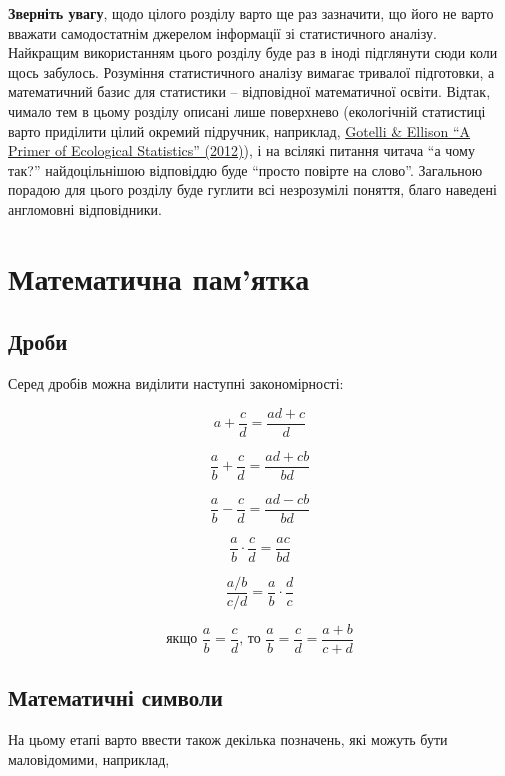\documentclass[
  11pt,
]{book}
\begin{document}
\textbf{{Зверніть увагу}}, щодо цілого розділу варто ще раз зазначити, що його не варто вважати самодостатнім джерелом інформації зі статистичного аналізу. Найкращим використанням цього розділу буде раз в іноді підглянути сюди коли щось забулось. Розуміння статистичного аналізу вимагає тривалої підготовки, а математичний базис для статистики -- відповідної математичної освіти. Відтак, чимало тем в цьому розділу описані лише поверхнево (екологічній статистиці варто приділити цілий окремий підручник, наприклад, \href{https://global.oup.com/academic/product/a-primer-of-ecological-statistics-9781605350646?cc=us&lang=en&}{Gotelli \& Ellison ``A Primer of Ecological Statistics'' (2012)}), і на всілякі питання читача ``а чому так?'' найдоцільнішою відповіддю буде ``просто повірте на слово''. Загальною порадою для цього розділу буде гуглити всі незрозумілі поняття, благо наведені англомовні відповідники.

\section{Математична пам'ятка}\label{algebra}

\subsection{Дроби}\label{ux434ux440ux43eux431ux438}

Серед дробів можна виділити наступні закономірності:

\[a+\frac{c}{d} = \frac{ad+c}{d}\]

\[\frac{a}{b}+\frac{c}{d} = \frac{ad+cb}{bd}\]

\[\frac{a}{b} - \frac{c}{d} = \frac{ad-cb}{bd}\]

\[\frac{a}{b} \cdot \frac{c}{d} = \frac{ac}{bd}\]

\[\frac{a/b}{c/d} = \frac{a}{b} \cdot \frac{d}{c}\]

\[\text{якщо } \frac{a}{b} = \frac{c}{d} \text{, то } \frac{a}{b} = \frac{c}{d} = \frac{a+b}{c+d}\]

\subsection{Математичні символи}\label{ux43cux430ux442ux435ux43cux430ux442ux438ux447ux43dux456-ux441ux438ux43cux432ux43eux43bux438}

На цьому етапі варто ввести також декілька позначень, які можуть бути маловідомими, наприклад,
\end{document}

